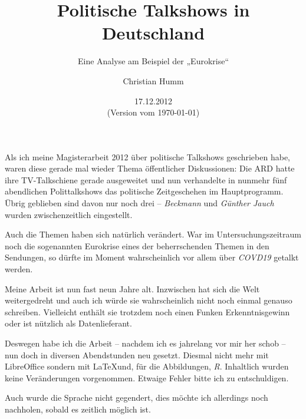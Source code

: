 \documentclass[a4paper,parskip=half,german,DIV=10,captions=tableheading]{scrreprt}
\begin{document}
	
\subject{Wissenschaftliche Hausarbeit zur Erlangung des akademischen Grades eines Magister Artium M.A.}
\title{Politische Talkshows in Deutschland}
\subtitle{Eine Analyse am Beispiel der „Eurokrise“}
\author{Christian Humm}
\date{17.12.2012 \\ (Version vom \today)}
\publishers{Betreut von Prof. Dr. Hans-Jürgen Bucher (Universität Trier)}
\extratitle{\centering Christian Humm \\ Politische Talkshows in Deutschland \\ \copyright 2012 (neu gesetzt 2021) \\ \href{https://creativecommons.org/licenses/by/4.0/deed.de}{CC-BY 4.0} \\ \href{https://doi.org/10.5281/zenodo.4541440}{DOI 10.5281/zenodo.4541440}}
\maketitle

Als ich meine Magisterarbeit 2012 über politische Talkshows geschrieben habe, waren diese gerade mal wieder Thema öffentlicher Diskussionen: Die ARD hatte ihre TV-Talkschiene gerade ausgeweitet und nun verhandelte in nunmehr fünf abendlichen Polittalkshows das politische Zeitgeschehen im Hauptprogramm. Übrig geblieben sind davon nur noch drei – \textit{Beckmann} und \textit{Günther Jauch} wurden zwischenzeitlich eingestellt.

Auch die  Themen haben sich natürlich verändert. War im Untersuchungszeitraum noch die sogenannten Eurokrise eines der beherrschenden Themen in den Sendungen, so dürfte im Moment wahrscheinlich vor allem über \textit{COVD19} getalkt werden.

Meine Arbeit ist nun fast neun Jahre alt. Inzwischen hat sich die Welt weitergedreht und auch ich würde sie wahrscheinlich nicht noch einmal genauso schreiben. Vielleicht enthält sie trotzdem noch einen Funken Erkenntnisgewinn oder ist nützlich als Datenlieferant.

Deswegen habe ich die Arbeit -- nachdem ich es jahrelang vor mir her schob -- nun doch in diversen Abendstunden neu gesetzt. Diesmal nicht mehr mit LibreOffice sondern mit \LaTeX und, für die Abbildungen, \textit{R}. Inhaltlich wurden keine Veränderungen vorgenommen. Etwaige Fehler bitte ich zu entschuldigen.

Auch wurde die Sprache nicht gegendert, dies möchte ich allerdings noch nachholen, sobald es zeitlich möglich ist.
\end{document}
